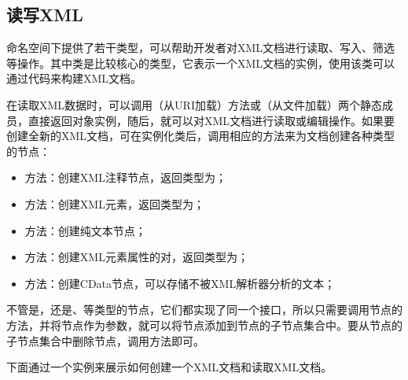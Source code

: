 \subsection{读写XML}

命名空间下提供了若干类型，可以帮助开发者对XML文档进行读取、写入、筛选等操作。其中类是比较核心的类型，它表示一个XML文档的实例，使用该类可以通过代码来构建XML文档。

在读取XML数据时，可以调用（从URI加载）方法或（从文件加载）两个静态成员，直接返回对象实例，随后，就可以对XML文档进行读取或编辑操作。如果要创建全新的XML文档，可在实例化类后，调用相应的方法来为文档创建各种类型的节点：

\begin{itemize}
	\item {}方法：创建XML注释节点，返回类型为；
	\item {}方法：创建XML元素，返回类型为；
	\item {}方法：创建纯文本节点；
	\item {}方法：创建XML元素属性的对，返回类型为；
	\item {}方法：创建CData节点，可以存储不被XML解析器分析的文本；
\end{itemize}

不管是，还是、等类型的节点，它们都实现了同一个接口，所以只需要调用节点的方法，并将节点作为参数，就可以将节点添加到节点的子节点集合中。要从节点的子节点集合中删除节点，调用方法即可。

下面通过一个实例来展示如何创建一个XML文档和读取XML文档。

